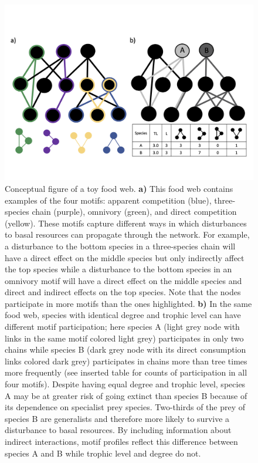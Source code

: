 \documentclass[12pt]{article}
\begin{document}
\begin{spacing}{2.0}
        \begin{figure}[hb!]
        \centering
        \includegraphics[width=1.0\textwidth]{manuscript/figures/concept_fig_ver2.png}
        \caption{Conceptual figure of a toy food web. \textbf{a)} This food web contains examples of the four motifs: apparent competition (blue), three-species chain (purple), omnivory (green), and direct competition (yellow). These motifs capture different ways in which disturbances to basal resources can propagate through the network. For example, a disturbance to the bottom species in a three-species chain will have a direct effect on the middle species but only indirectly affect the top species while a disturbance to the bottom species in an omnivory motif will have a direct effect on the middle species and direct and indirect effects on the top species. 
        Note that the nodes participate in more motifs than the ones highlighted. \textbf{b)} In the same food web, species with identical degree and trophic level can have different motif participation; here species A (light grey node with links in the same motif colored light grey) participates in only two chains while species B (dark grey node with its direct consumption links colored dark grey) participates in chains more than tree times more frequently (see inserted table for counts of participation in all four motifs). 
        Despite having equal degree and trophic level, species A may be at greater risk of going extinct than species B because of its dependence on specialist prey species. Two-thirds of the prey of species B are generalists and therefore more likely to survive a disturbance to basal resources. By including information about indirect interactions, motif profiles reflect this difference between species A and B while trophic level and degree do not.}
    \label{fig:concept}
    \end{figure}


\end{spacing}
\end{document}
